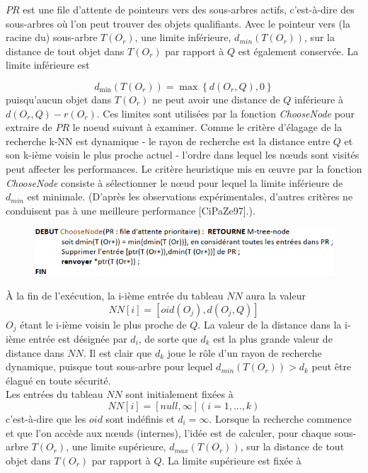 $ PR $ est une file d'attente de pointeurs vers des sous-arbres actifs, c'est-à-dire des sous-arbres où l'on peut trouver des objets qualifiants. Avec le pointeur vers (la racine du) sous-arbre $ T (O_r) $, une limite inférieure, $ d_{min}(T (O_r)) $, sur la distance de tout objet dans $ T (O_r) $ par rapport à $ Q $ est également conservée. La limite inférieure est

\begin{equation}
    d_{\min}(T(O_r)) = \max \left\{d(O_r, Q), 0\right\}
\end{equation}
puisqu'aucun objet dans $ T(O_r) $ ne peut avoir une distance de $  Q  $ inférieure à $ d(O_r, Q)-r(O_r) $.
Ces limites sont utilisées par la fonction \textit{ChooseNode} pour extraire de $ PR $ le noeud suivant à examiner. Comme le critère d'élagage de la recherche k-NN est dynamique - le rayon de recherche est la distance entre $ Q $ et son k-ième voisin le plus proche actuel - l'ordre dans lequel les nœuds sont visités peut affecter les performances. Le critère heuristique mis en œuvre par la fonction \textit{ChooseNode} consiste à sélectionner le nœud pour lequel la limite inférieure de $ d_{min} $ est minimale. (D'après les observations expérimentales, d'autres critères ne conduisent pas à une meilleure performance [CiPaZe97].).
\begin{figure}[H]
	\centering
	\includegraphics[width=.9 \textwidth]{Figures/choosenode.png} %
\end{figure} 


À la fin de l'exécution, la i-ième entrée du tableau $ NN $ aura la valeur  \begin{displaymath}
	NN[i] = [oid(O_j),d(O_j, Q)] 
\end{displaymath}
$ O_j $ étant le i-ième voisin le plus proche de $ Q $. La valeur de la distance dans la i-ième entrée est désignée par $ d_i $, de sorte que $ d_k $ est la plus grande valeur de distance dans $ NN $. Il est clair que $ d_k $ joue le rôle d'un rayon de recherche dynamique, puisque tout sous-arbre pour lequel $ d_{min}(T(O_r)) > d_k $ peut être élagué en toute sécurité.\\

Les entrées du tableau $ NN $ sont initialement fixées à  \begin{displaymath}
	NN[i] = [null ,\infty] (i= 1,..., k)
\end{displaymath} c'est-à-dire que les $ oid $ sont indéfinis et $ d_i = \infty $. Lorsque la recherche commence et que l'on accède aux nœuds (internes), l'idée est de calculer, pour chaque sous-arbre $ T(O_r) $, une limite supérieure, $ d_{max}(T(O_r)) $, sur la distance de tout objet dans $ T(O_r) $ par rapport à $ Q $. La limite supérieure est fixée à

